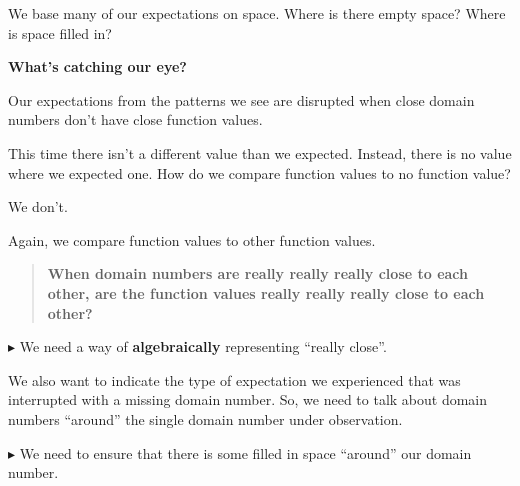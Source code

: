 \documentclass{ximera}
\begin{document}
We base many of our expectations on space.  Where is there empty space?  Where is space filled in? 

































\begin{observation}  \textbf{\textcolor{-red!75}{What's catching our eye?}}


Our expectations from the patterns we see are disrupted when close domain numbers don't have close function values.


\end{observation}

This time there isn't a different value than we expected.  Instead, there is no value where we expected one. How do we compare function values to no function value? 

We don't.

Again, we compare function values to other function values. 


\begin{quote}
 \textbf{\textcolor{blue!55!black}{When domain numbers are really really really close to each other, are the function values really really really close to each other?}} 
\end{quote}




\textbf{\textcolor{red!70!darkgray}{$\blacktriangleright$}} We need a way of \textbf{algebraically} representing ``really close''.  


We also want to indicate the type of expectation we experienced that was interrupted with a missing domain number. So, we need to talk about domain numbers ``around'' the single domain number under observation. 


\textbf{\textcolor{red!70!darkgray}{$\blacktriangleright$}} We need to ensure that there is some filled in space ``around'' our domain number. 
\end{document}
